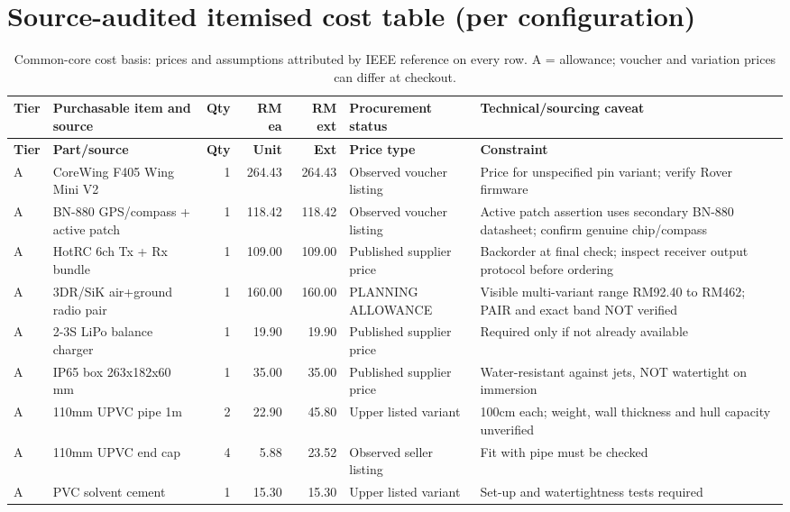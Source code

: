 \section{Source-audited itemised cost table (per configuration)}
\scriptsize
\begin{longtable}{L{12mm}L{47mm}r r r L{31mm}L{36mm}}
\caption{Common-core cost basis: prices and assumptions attributed by IEEE reference on every row. A = allowance; voucher and variation prices can differ at checkout.}\label{tab:bom}\\
\toprule \textbf{Tier} & \textbf{Purchasable item and source} & \textbf{Qty} & \textbf{RM ea} & \textbf{RM ext} & \textbf{Procurement status} & \textbf{Technical/sourcing caveat}\\\midrule\endfirsthead
\toprule \textbf{Tier} & \textbf{Part/source} & \textbf{Qty} & \textbf{Unit} & \textbf{Ext} & \textbf{Price type} & \textbf{Constraint}\\\midrule\endhead\bottomrule\endfoot
A & CoreWing F405 Wing Mini V2 \cite{coreShop} & 1 & 264.43 & 264.43 & Observed voucher listing & Price for unspecified pin variant; verify Rover firmware \\
A & BN-880 GPS/compass + active patch \cite{bnShop} & 1 & 118.42 & 118.42 & Observed voucher listing & Active patch assertion uses secondary BN-880 datasheet; confirm genuine chip/compass \\
A & HotRC 6ch Tx + Rx bundle \cite{hotrc} & 1 & 109.00 & 109.00 & Published supplier price & Backorder at final check; inspect receiver output protocol before ordering \\
A & 3DR/SiK air+ground radio pair \cite{radioShop} & 1 & 160.00 & 160.00 & PLANNING ALLOWANCE & Visible multi-variant range RM92.40 to RM462; PAIR and exact band NOT verified \\
A & 2-3S LiPo balance charger \cite{charger} & 1 & 19.90 & 19.90 & Published supplier price & Required only if not already available \\
A & IP65 box 263x182x60 mm \cite{box} & 1 & 35.00 & 35.00 & Published supplier price & Water-resistant against jets, NOT watertight on immersion \\
A & 110mm UPVC pipe 1m \cite{pipe} & 2 & 22.90 & 45.80 & Upper listed variant & 100cm each; weight, wall thickness and hull capacity unverified \\
A & 110mm UPVC end cap \cite{cap} & 4 & 5.88 & 23.52 & Observed seller listing & Fit with pipe must be checked \\
A & PVC solvent cement \cite{glue} & 1 & 15.30 & 15.30 & Upper listed variant & Set-up and watertightness tests required \\

\end{longtable}
